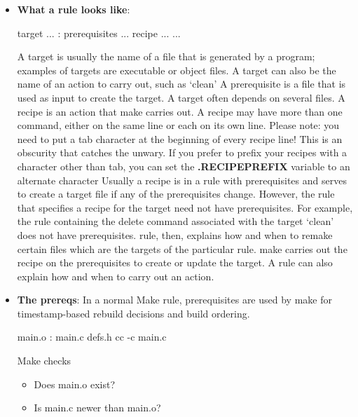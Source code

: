 \documentclass{report}
\begin{document}
    \begin{itemize}
        \item \textbf{What a rule looks like}:
            \bigbreak \noindent 
            \begin{bashcode}
            target ... : prerequisites ...
                recipe 
                ...
                ...
            \end{bashcode}
            \bigbreak \noindent 
            A target is usually the name of a file that is generated by a program; examples of targets are executable or object files. A target can also be the name of an action to carry out, such as ‘clean’
            \bigbreak \noindent 
            A prerequisite is a file that is used as input to create the target. A target often depends on several files.
            \bigbreak \noindent 
            A recipe is an action that make carries out. A recipe may have more than one command, either on the same line or each on its own line. Please note: you need to put a tab character at the beginning of every recipe line! This is an obscurity that catches the unwary. If you prefer to prefix your recipes with a character other than tab, you can set the \textbf{.RECIPEPREFIX} variable to an alternate character
            \bigbreak \noindent 
            Usually a recipe is in a rule with prerequisites and serves to create a target file if any of the prerequisites change. However, the rule that specifies a recipe for the target need not have prerequisites. For example, the rule containing the delete command associated with the target ‘clean’ does not have prerequisites.
            \bigbreak \noindent 
             rule, then, explains how and when to remake certain files which are the targets of the particular rule. make carries out the recipe on the prerequisites to create or update the target. A rule can also explain how and when to carry out an action. 
        \item \textbf{The prereqs}: In a normal Make rule, prerequisites are used by make for timestamp-based rebuild decisions and build ordering.
            \bigbreak \noindent 
            \begin{bashcode}
                main.o : main.c defs.h
                    cc -c main.c
            \end{bashcode}
            \bigbreak \noindent 
            Make checks
            \begin{itemize}
                \item Does main.o exist?
                \item Is main.c newer than main.o?

\end{itemize}
\end{itemize}
\end{document}
